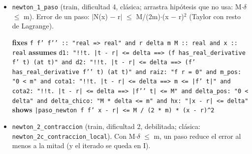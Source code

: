 \documentclass[11pt,a4paper]{article}
\begin{document}
\begin{itemize}
  \item \texttt{newton\_\allowbreak{}1\_\allowbreak{}paso} (train, dificultad 4, clásica; arrastra hipótesis que no usa: M$\cdot \delta $ $\le $ m). Error de un paso: $|$N(x) $-$ r$|$ $\le $ M/(2m)$\cdot $(x $-$ r)$^{2}$ (Taylor con resto de Lagrange).\\
  {\footnotesize \textbf{fixes} \texttt{f f' f'{}' :\allowbreak{}:\allowbreak{} "real =\allowbreak{}> real" and r delta m M :\allowbreak{}:\allowbreak{} real and x :\allowbreak{}:\allowbreak{} real} \textbf{assumes} \texttt{d1:\allowbreak{} "!{}!t. |\allowbreak{}t -\allowbreak{} r|\allowbreak{} <=\allowbreak{} delta =\allowbreak{}=\allowbreak{}> (\allowbreak{}f has\_\allowbreak{}real\_\allowbreak{}derivative f' t) (\allowbreak{}at t)" and d2:\allowbreak{} "!{}!t. |\allowbreak{}t -\allowbreak{} r|\allowbreak{} <=\allowbreak{} delta =\allowbreak{}=\allowbreak{}> (\allowbreak{}f' has\_\allowbreak{}real\_\allowbreak{}derivative f'{}' t) (\allowbreak{}at t)" and raiz:\allowbreak{} "f r =\allowbreak{} 0" and m\_\allowbreak{}pos:\allowbreak{} "0 < m" and cota1:\allowbreak{} "!{}!t. |\allowbreak{}t -\allowbreak{} r|\allowbreak{} <=\allowbreak{} delta =\allowbreak{}=\allowbreak{}> m <=\allowbreak{} |\allowbreak{}f' t|\allowbreak{}" and cota2:\allowbreak{} "!{}!t. |\allowbreak{}t -\allowbreak{} r|\allowbreak{} <=\allowbreak{} delta =\allowbreak{}=\allowbreak{}> |\allowbreak{}f'{}' t|\allowbreak{} <=\allowbreak{} M" and delta\_\allowbreak{}pos:\allowbreak{} "0 < delta" and delta\_\allowbreak{}chico:\allowbreak{} "M *\allowbreak{} delta <=\allowbreak{} m" and hx:\allowbreak{} "|\allowbreak{}x -\allowbreak{} r|\allowbreak{} <=\allowbreak{} delta"} \textbf{shows} \texttt{|\allowbreak{}paso\_\allowbreak{}newton f f' x -\allowbreak{} r|\allowbreak{} <=\allowbreak{} M /\allowbreak{} (\allowbreak{}2 *\allowbreak{} m) *\allowbreak{} (\allowbreak{}x -\allowbreak{} r)\textasciicircum{}2}\par}
  \item \texttt{newton\_\allowbreak{}2\_\allowbreak{}contraccion} (train, dificultad 2, debilitada; clásica: \texttt{newton\_\allowbreak{}2c\_\allowbreak{}contraccion\_\allowbreak{}local}). Con M$\cdot \delta $ $\le $ m, un paso reduce el error al menos a la mitad (y el iterado se queda en I).\\

\end{itemize}
\end{document}
